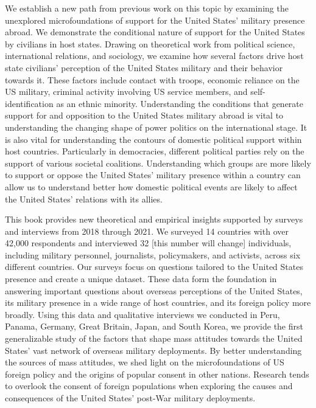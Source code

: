 We establish a new path from previous work on this topic by examining the unexplored microfoundations of support for the United States' military presence abroad. We demonstrate the conditional nature of support for the United States by civilians in host states. Drawing on theoretical work from political science, international relations, and sociology, we examine how several factors drive host state civilians' perception of the United States military and their behavior towards it. These factors include contact with troops, economic reliance on the US military, criminal activity involving US service members, and self-identification as an ethnic minority. Understanding the conditions that generate support for and opposition to the United States military abroad is vital to understanding the changing shape of power politics on the international stage. It is also vital for understanding the contours of domestic political support within host countries. Particularly in democracies, different political parties rely on the support of various societal coalitions. Understanding which groups are more likely to support or oppose the United States' military presence within a country can allow us to understand better how domestic political events are likely to affect the United States' relations with its allies. 


This book provides new theoretical and empirical insights supported by surveys and interviews from 2018 through 2021. We surveyed 14 countries with over 42,000 respondents and interviewed 32 [this number will change] individuals, including military personnel, journalists, policymakers, and activists, across six different countries. Our surveys focus on questions tailored to the United States presence and create a unique dataset. These data form the foundation in answering important questions about overseas perceptions of the United States, its military presence in a wide range of host countries, and its foreign policy more broadly. Using this data and qualitative interviews we conducted in Peru, Panama, Germany, Great Britain, Japan, and South Korea, we provide the first generalizable study of the factors that shape mass attitudes towards the United States' vast network of overseas military deployments. By better understanding the sources of mass attitudes, we shed light on the microfoundations of US foreign policy and the origins of popular consent in other nations. Research tends to overlook the consent of foreign populations when exploring the causes and consequences of the United States' post-War military deployments. 


